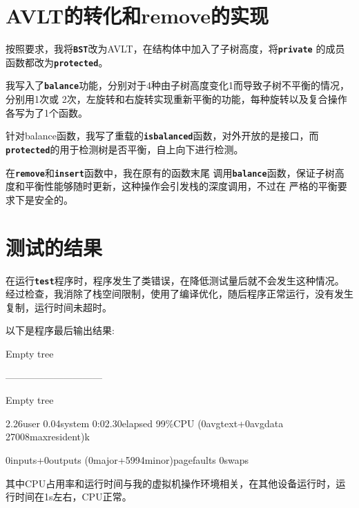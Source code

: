 \documentclass[UTF8]{ctexart}
\begin{document}
\pagestyle{fancy}
\fancyhead{}

\section{AVLT的转化和remove的实现}
按照要求，我将\textbf{\texttt{BST}}改为AVLT，在结构体中加入了子树高度，将\textbf{\texttt{private}}
的成员函数都改为\textbf{\texttt{protected}}。\par
我写入了\textbf{\texttt{balance}}功能，分别对于4种由子树高度变化1而导致子树不平衡的情况，分别用1次或
2次，左旋转和右旋转实现重新平衡的功能，每种旋转以及复合操作各写为了1个函数。\par
针对balance函数，我写了重载的\textbf{\texttt{isbalanced}}函数，对外开放的是接口，而
\textbf{\texttt{protected}}的用于检测树是否平衡，自上向下进行检测。\par
在\textbf{\texttt{remove}}和\textbf{\texttt{insert}}函数中，我在原有的函数末尾
调用\textbf{\texttt{balance}}函数，保证子树高度和平衡性能够随时更新，这种操作会引发栈的深度调用，不过在
严格的平衡要求下是安全的。\par
\section{测试的结果}
在运行\textbf{\texttt{test}}程序时，程序发生了类错误，在降低测试量后就不会发生这种情况。
经过检查，我消除了栈空间限制，使用了编译优化，随后程序正常运行，没有发生复制，运行时间未超时。\par
以下是程序最后输出结果:\par
Empty tree\par
------------------------------\par
Empty tree\par
2.26user 0.04system 0:02.30elapsed 99\%CPU (0avgtext+0avgdata 27008maxresident)k \par
0inputs+0outputs (0major+5994minor)pagefaults 0swaps\par
其中CPU占用率和运行时间与我的虚拟机操作环境相关，在其他设备运行时，运行时间在1s左右，CPU正常。
\end{document}
